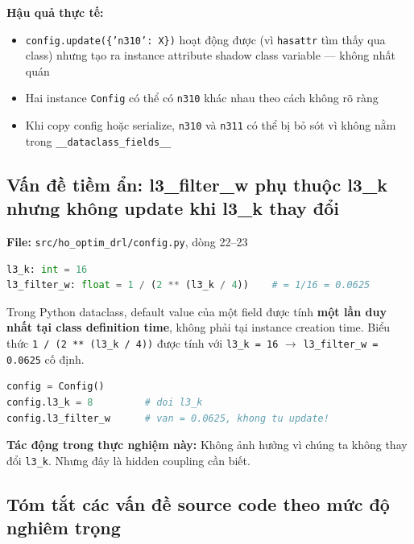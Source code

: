 \documentclass[11pt]{article}
\begin{document}
\textbf{Hậu quả thực tế:}
\begin{itemize}
  \item \texttt{config.update(\{'n310': X\})} hoạt động được (vì \texttt{hasattr} tìm thấy qua class) nhưng tạo ra instance attribute shadow class variable --- không nhất quán
  \item Hai instance \texttt{Config} có thể có \texttt{n310} khác nhau theo cách không rõ ràng
  \item Khi copy config hoặc serialize, \texttt{n310} và \texttt{n311} có thể bị bỏ sót vì không nằm trong \texttt{\_\_dataclass\_fields\_\_}
\end{itemize}

\subsection{Vấn đề tiềm ẩn: l3\_filter\_w phụ thuộc l3\_k nhưng không update khi l3\_k thay đổi}

\textbf{File:} \texttt{src/ho\_optim\_drl/config.py}, dòng 22--23

\begin{lstlisting}[language=Python]
l3_k: int = 16
l3_filter_w: float = 1 / (2 ** (l3_k / 4))    # = 1/16 = 0.0625
\end{lstlisting}

Trong Python dataclass, default value của một field được tính \textbf{một lần duy nhất tại class definition time}, không phải tại instance creation time. Biểu thức \texttt{1 / (2 ** (l3\_k / 4))} được tính với \texttt{l3\_k = 16} $\to$ \texttt{l3\_filter\_w = 0.0625} cố định.

\begin{lstlisting}[language=Python]
config = Config()
config.l3_k = 8         # doi l3_k
config.l3_filter_w      # van = 0.0625, khong tu update!
\end{lstlisting}

\textbf{Tác động trong thực nghiệm này:} Không ảnh hưởng vì chúng ta không thay đổi \texttt{l3\_k}. Nhưng đây là hidden coupling cần biết.

\subsection{Tóm tắt các vấn đề source code theo mức độ nghiêm trọng}
\end{document}
